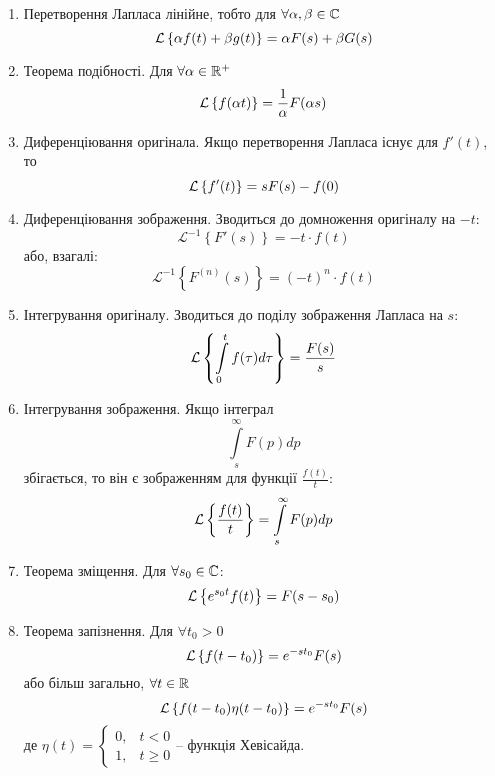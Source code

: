 \begin{enumerate}[label=\arabic*.]
	\item Перетворення Лапласа лінійне, тобто для $\forall \alpha, \beta \in \mathbb{C}$
            	\begin{equation}
            		\mathcal{L}\left\{\alpha f(t) + \beta g(t)\right\} = \alpha F(s) + \beta G(s)
            	\end{equation}
	\item Теорема подібності. Для $\forall \alpha \in \mathbb{R}^+$
		\begin{equation}
			\mathcal{L}\left\{f(\alpha t)\right\} = \frac{1}{\alpha} F(\alpha s)
		\end{equation}
	\item Диференціювання оригінала. Якщо перетворення Лапласа існує для $f′(t)$, то
		\begin{equation}
			\mathcal{L}\left\{f'(t)\right\} = sF(s) - f(0)
		\end{equation}
	\item Диференціювання зображення. Зводиться до домноження оригіналу на $-t$:
		\begin{equation}
			\mathcal{L}^{-1} \left\{ F'(s)\right\} = -t \cdot f(t)
		\end{equation}
		або, взагалі:
		\begin{equation}
			\mathcal{L}^{-1} \left\{ F^{(n)}(s)\right\} = (-t)^{n} \cdot f(t)
		\end{equation}
	\item Інтегрування оригіналу. Зводиться до поділу зображення Лапласа на $s$:
		\begin{equation}
			\label{eq:laplace_int_origin}
			\mathcal{L}\left\{\int\limits_0^t f(\tau) d\tau\right\} = \frac{F(s)}{s}
		\end{equation}
	\item Інтегрування зображення. Якщо інтеграл
	$$\int\limits_s^\infty F(p) dp$$
	збігається, то він є зображенням для функції $\frac{f(t)}{t}$:
		\begin{equation}
			\label{eq:laplace_int_image}
			\mathcal{L}\left\{\frac{f(t)}{t}\right\} = \int\limits_s^\infty F(p) dp
		\end{equation}
	\item Теорема зміщення. Для $\forall s_0 \in \mathbb{C}$:
		\begin{equation}
			\mathcal{L}\left\{e^{s_0 t}f(t)\right\} = F(s - s_0)
		\end{equation}
	\item Теорема запізнення. Для $\forall t_0 > 0$
		\begin{equation}
			\mathcal{L}\left\{f(t - t_0)\right\} = e^{-s t_0} F(s)
		\end{equation}
		або більш загально, $\forall t \in \mathbb{R}$
		\begin{equation}
			\mathcal{L}\left\{f(t - t_0) \eta(t - t_0)\right\} = e^{-s t_0} F(s)
			\label{eq:laplace_lag}
		\end{equation}
		де $\eta(t) = 
		\begin{cases}
			0, &t < 0\\
			1, &t ≥ 0
		\end{cases}
		\text{– функція Хевісайда.}
		$


\end{enumerate}
